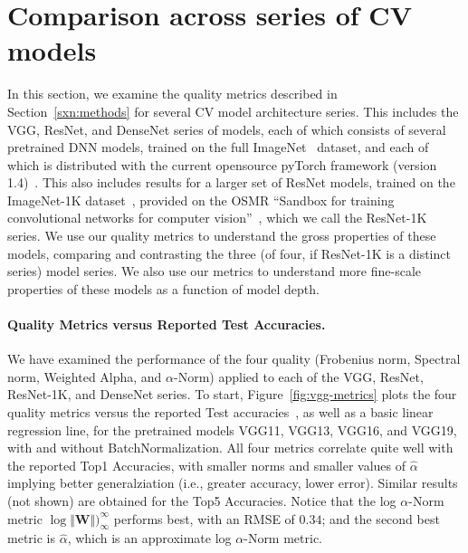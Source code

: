 \section{Comparison across series of CV models}
\label{sxn:cv}

In this section, we examine the quality metrics described in Section~\ref{sxn:methods} for several CV model architecture series.
This includes the VGG, ResNet, and DenseNet series of models, each of which consists of several pretrained DNN models, trained on the full ImageNet~\cite{imagenet} dataset, and each of which is distributed with the current opensource pyTorch framework (version 1.4)~\cite{pyTorch}.
This also includes results for a larger set of ResNet models, trained on the ImageNet-1K dataset~\cite{imagenet1k}, provided on the OSMR ``Sandbox for training convolutional networks for computer vision''~\cite{osmr}, which we call the ResNet-1K series.
We use our quality metrics to understand the gross properties of these models, comparing and contrasting the three (of four, if ResNet-1K is a distinct series) model series.
We also use our metrics to understand more fine-scale properties of these models as a function of model depth.


\paragraph{Quality Metrics versus Reported Test Accuracies.}

We have examined the performance of the four quality (Frobenius norm, Spectral norm, Weighted Alpha, and $\alpha$-Norm) applied to each of the VGG, ResNet, ResNet-1K, and DenseNet series.
To start, Figure~\ref{fig:vgg-metrics} plots the four quality metrics versus the reported Test accuracies~\cite{pyTorchVgg}, as well as a basic linear regression line, 
for the pretrained models VGG11, VGG13, VGG16, and VGG19, with and without BatchNormalization.
All four metrics correlate quite well with the reported Top1 Accuracies, with smaller norms and smaller values of $\hat{\alpha}$ implying better generalziation (i.e., greater accuracy, lower error). 
Similar results (not shown) are obtained for the Top5 Accuracies.  
Notice that the log $\alpha$-Norm metric $\log\Vert\mathbf{W}\Vert)_{\infty}^{\infty}$ 
performs best, with an RMSE of $0.34$; and the second best metric is $\hat\alpha$, which is an approximate log $\alpha$-Norm metric.


